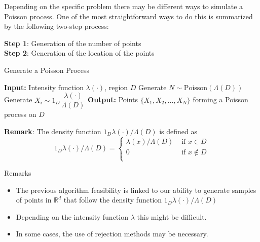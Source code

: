 \documentclass[8pt]{beamer}
\begin{document}
\begin{frame}
Depending on the specific problem there may be different ways to simulate a Poisson process. One of the most straightforward ways to do this is summarized by the following two-step process:

\vspace{2mm}

\textbf{Step 1}: Generation of the number of points \\
\textbf{Step 2}: Generation of the location of the points

\begin{algorithm}[H]
\caption{Generate a Poisson Process}\label{alg:poisson-process}
\begin{algorithmic}[1]
  \State \textbf{Input:} Intensity function $\lambda(\cdot)$, region $D$
  \State Generate $N \sim \text{Poisson}(\Lambda(D))$
    \State Generate $X_i \sim 1_D \, \dfrac{\lambda(\cdot)}{\Lambda(D)}$
  \EndFor
  \State \textbf{Output:} Points $\{X_1, X_2, \ldots, X_N\}$ forming a Poisson process on $D$
\end{algorithmic}
\end{algorithm}

\vspace{2mm}

\textbf{Remark}: The density function $1_D \lambda(\cdot)/\Lambda(D)$ is defined as
\begin{equation*}
1_D \lambda(\cdot)/\Lambda(D)=\left\{ 
\begin{array}{ll}  
\lambda(x)/\Lambda(D) & \text{ if } x \in D\\
0 & \text{ if } x \notin D \\
\end{array}\right.
\end{equation*}
\end{frame}

\begin{frame}{Remarks}
\begin{itemize}
	\item The previous algorithm feasibility is linked to our ability to generate 
samples of points in $\mathbb{R}^d$ that follow the density function $1_D \lambda(\cdot)/\Lambda(D)$
	\item Depending on the intensity function $\lambda$ this might be difficult.
	\item In some cases, the use of rejection methods may be necessary.
\end{itemize}
\end{frame}
\end{document}
